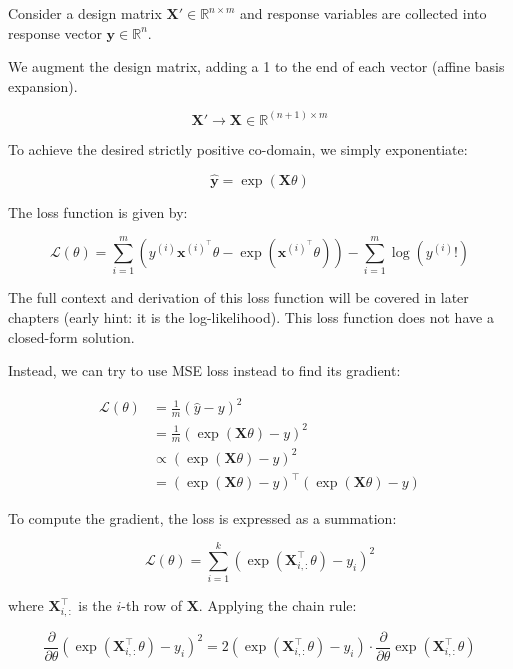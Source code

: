 Consider a design matrix $\bm{X}' \in \mathbb{R}^{n \times m}$ and response variables are collected into response vector $\bm{y} \in \mathbb{R}^n$. \bigskip

We augment the design matrix, adding a 1 to the end of each vector (affine basis expansion).

\begin{equation}
    \bm{X}' \rightarrow \bm{X} \in \mathbb{R}^{(n+1) \times m}
\end{equation}

To achieve the desired strictly positive co-domain, we simply exponentiate:

\begin{equation}
    \hat{\bm{y}} = \exp(\bm{X} {\theta})
\end{equation}

The loss function is given by:

\begin{equation}
    \mathcal{L}(\theta) = \sum_{i=1}^{m} \left( y^{(i)} \bm{x}^{(i)^\top} \theta - \exp(\bm{x}^{(i)^\top} \theta) \right) - \sum_{i=1}^{m} \log\left(y^{(i)}!\right)
\end{equation}

The full context and derivation of this loss function will be covered in later chapters (early hint: it is the log-likelihood). This loss function does not have a closed-form solution. \bigskip

Instead, we can try to use MSE loss instead to find its gradient:

\begin{align*}
    \mathcal{L}(\theta) & = \frac{1}{m} (\hat{y} - y)^2                            \\
                        & = \frac{1}{m} (\exp(\bm{X}\theta) - y)^2                 \\
                        & \propto (\exp(\bm{X}\theta) - y)^2                       \\
                        & = (\exp(\bm{X}\theta) - y)^\top (\exp(\bm{X}\theta) - y)
\end{align*}

To compute the gradient, the loss is expressed as a summation:

\[
    \mathcal{L}(\theta) = \sum_{i=1}^{k} (\exp(\bm{X}_{i,:}^\top \theta) - y_i)^2
\]

where \(\bm{X}_{i,:}^\top\) is the \(i\)-th row of \(\bm{X}\). Applying the chain rule:

\[
    \frac{\partial}{\partial \theta} \left( \exp(\bm{X}_{i,:}^\top \theta) - y_i \right)^2 = 2 (\exp(\bm{X}_{i,:}^\top \theta) - y_i) \cdot \frac{\partial}{\partial \theta} \exp(\bm{X}_{i,:}^\top \theta)
\]

